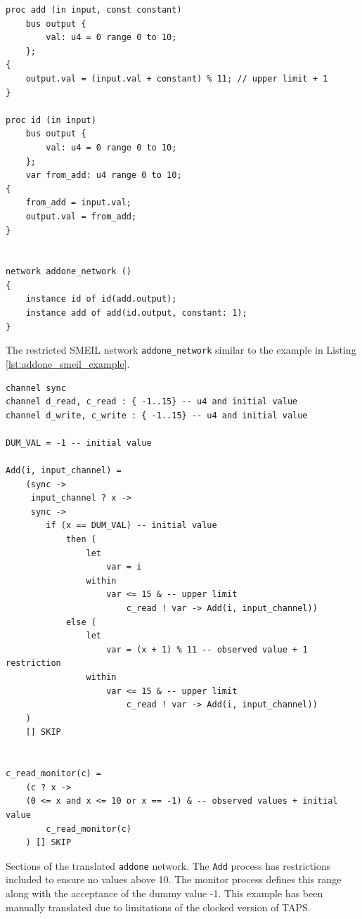 \begin{listing}
\begin{verbatim}
proc add (in input, const constant)
    bus output {
        val: u4 = 0 range 0 to 10;
    };
{
    output.val = (input.val + constant) % 11; // upper limit + 1
}

proc id (in input)
    bus output {
        val: u4 = 0 range 0 to 10;
    };
    var from_add: u4 range 0 to 10;
{
    from_add = input.val;
    output.val = from_add;
}


network addone_network ()
{
    instance id of id(add.output);
    instance add of add(id.output, constant: 1);
}
\end{verbatim}
\caption{The restricted SMEIL network \texttt{addone\_network} similar to the example in Listing \ref{lst:addone_smeil_example}.}
\label{lst:addone_mod_example}
\end{listing}
\begin{listing}
\begin{verbatim}
channel sync
channel d_read, c_read : { -1..15} -- u4 and initial value
channel d_write, c_write : { -1..15} -- u4 and initial value

DUM_VAL = -1 -- initial value

Add(i, input_channel) =
    (sync ->
     input_channel ? x ->
     sync ->
        if (x == DUM_VAL) -- initial value
            then (
                let
                    var = i
                within
                    var <= 15 & -- upper limit
                        c_read ! var -> Add(i, input_channel))
            else (
                let
                    var = (x + 1) % 11 -- observed value + 1 restriction
                within
                    var <= 15 & -- upper limit
                        c_read ! var -> Add(i, input_channel))
    )
    [] SKIP


c_read_monitor(c) =
    (c ? x ->
    (0 <= x and x <= 10 or x == -1) & -- observed values + initial value
        c_read_monitor(c)
    ) [] SKIP

\end{verbatim}
\caption{Sections of the translated \texttt{addone} network. The \texttt{Add} process has restrictions included to ensure no values above 10. The monitor process defines this range along with the acceptance of the dummy value -1. This example has been manually translated due to limitations of the clocked version of TAPS.}
\label{lst:cspm_addone_restricted}
\end{listing}
